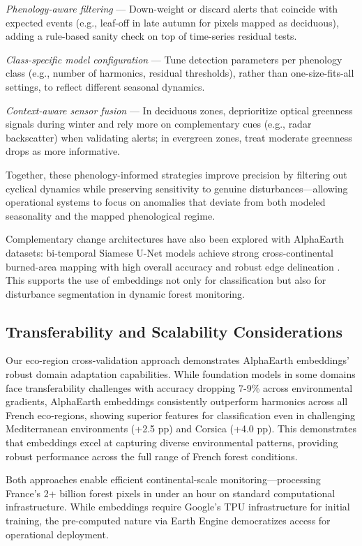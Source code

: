 \documentclass[utf8]{FrontiersinHarvard}
\begin{document}
\textit{Phenology-aware filtering} — Down-weight or discard alerts that coincide with expected events (e.g., leaf-off in late autumn for pixels mapped as deciduous), adding a rule-based sanity check on top of time-series residual tests.

\textit{Class-specific model configuration} — Tune detection parameters per phenology class (e.g., number of harmonics, residual thresholds), rather than one-size-fits-all settings, to reflect different seasonal dynamics.

\textit{Context-aware sensor fusion} — In deciduous zones, deprioritize optical greenness signals during winter and rely more on complementary cues (e.g., radar backscatter) when validating alerts; in evergreen zones, treat moderate greenness drops as more informative.

Together, these phenology-informed strategies improve precision by filtering out cyclical dynamics while preserving sensitivity to genuine disturbances—allowing operational systems to focus on anomalies that deviate from both modeled seasonality and the mapped phenological regime.

Complementary change architectures have also been explored with AlphaEarth datasets: bi-temporal Siamese U-Net models achieve strong cross-continental burned-area mapping with high overall accuracy and robust edge delineation \citep{Seydi2025AlphaEarthBurnedArea}. This supports the use of embeddings not only for classification but also for disturbance segmentation in dynamic forest monitoring.

\subsection{Transferability and Scalability Considerations}

Our eco-region cross-validation approach demonstrates AlphaEarth embeddings' robust domain adaptation capabilities. While foundation models in some domains face transferability challenges with accuracy dropping 7-9\% across environmental gradients, AlphaEarth embeddings consistently outperform harmonics across all French eco-regions, showing superior features for classification even in challenging Mediterranean environments (+2.5 pp) and Corsica (+4.0 pp). This demonstrates that embeddings excel at capturing diverse environmental patterns, providing robust performance across the full range of French forest conditions.

Both approaches enable efficient continental-scale monitoring—processing France's 2+ billion forest pixels in under an hour on standard computational infrastructure. While embeddings require Google's TPU infrastructure for initial training, the pre-computed nature via Earth Engine democratizes access for operational deployment.
\end{document}
